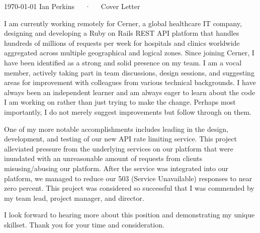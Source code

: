 \documentclass[11pt, a4paper]{awesome-cv}
\begin{document}
\makecvheader[C]

\makecvfooter
  {\today}
  {Ian Perkins~~~·~~~Cover Letter}
  {}

\makelettertitle

\begin{cvletter}

I am currently working remotely for Cerner, a global healthcare IT company, designing and developing a Ruby on Rails REST API platform that handles hundreds of millions of requests per week for hospitals and clinics worldwide aggregated across multiple geographical and logical zones. Since joining Cerner, I have been identified as a strong and solid presence on my team. I am a vocal member, actively taking part in team discussions, design sessions, and suggesting areas for improvement with colleagues from various technical backgrounds. I have always been an independent learner and am always eager to learn about the code I am working on rather than just trying to make the change. Perhaps most importantly, I do not merely suggest improvements but follow through on them.

One of my more notable accomplishments includes leading in the design, development, and testing of our new API rate limiting service. This project alleviated pressure from the underlying services on our platform that were inundated with an unreasonable amount of requests from clients misusing/abusing our platform. After the service was integrated into our platform, we managed to reduce our 503 (Service Unavailable) responses to near zero percent. This project was considered so successful that I was commended by my team lead, project manager, and director.

I look forward to hearing more about this position and demonstrating my unique skillset. Thank you for your time and consideration.

\end{cvletter}

\makeletterclosing
\end{document}
